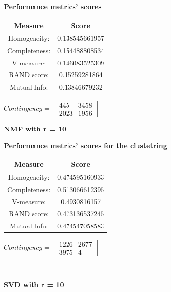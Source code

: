 \documentclass{report}
\begin{document}
\begin{center}
	\textbf{Performance metrics' scores} \\ \vspace{10pt}	
	\begin{tabular}{*{2}{c}}
		\toprule
		\textbf{Measure} & \textbf{Score} \\	
		\midrule
		Homogeneity: & 0.138545661957 \\
		\midrule
		Completeness: & 0.154488808534 \\
		\midrule
		V-measure: & 0.146083525309 \\
		\midrule
		RAND score: & 0.15259281864 \\
		\midrule
		Mutual Info: & 0.13846679232 \\
		\bottomrule
	\end{tabular}
	\qquad
	$Contingency = \left[ \begin{array}{*{2}{c}}
		445 	& 3458 \\
		2023 	& 1956 
		\end{array}\right]
		$
\end{center}
\newpage


\underline{\textbf{NMF with r = 10}} 

\begin{center}
	\textbf{Performance metrics' scores for the clustetring} \\ \vspace{10pt}	
	\begin{tabular}{*{2}{c}}
		\toprule
		\textbf{Measure} & \textbf{Score} \\
		\midrule
		Homogeneity: 		& 0.474595160933 \\
		\midrule
		Completeness: 		& 0.513066612395 \\
		\midrule
		V-measure: 			& 0.4930816157 \\
		\midrule
		RAND score: 		& 0.473136537245 \\
		\midrule
		Mutual Info: 		& 0.474547058583 \\
		\bottomrule
	\end{tabular}
	\qquad
	$Contingency = \left[\begin{array}{*{2}{c}}
		1226 & 2677 \\
		3975 & 4 
		\end{array}\right]
		$
\end{center}
\\ \vspace{20pt}


\underline{\textbf{SVD with r = 10} } 
\end{document}
